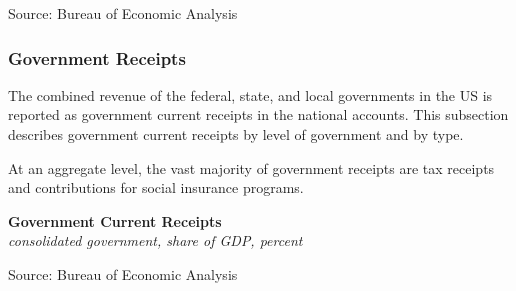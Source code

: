 \documentclass{report}
\makeatletter
\newcommand{\tbllink}[1]{\href{https://raw.githubusercontent.com/bdecon/US-chartbook/master/chartbook/data/#1}{\faTable}}
\newcommand*\short[1]{\expandafter\@gobbletwo\number\numexpr#1\relax}
\newcommand{\dateaxisticks}{
		date coordinates in=x, axis line style={draw=none},
		xmax={2023-11-30},
		max space between ticks=40,	    
		xtick={{1990-01-01}, {1992-01-01}, {1994-01-01}, 
			{1996-01-01}, {1998-01-01}, {2000-01-01}, 
			{2002-01-01}, {2004-01-01}, {2006-01-01},
			{2008-01-01}, {2010-01-01}, {2012-01-01}, {2014-01-01},
		    {2016-01-01}, {2018-01-01}, {2020-01-01}, {2022-01-01}, 
		    {2024-01-01}, {2026-01-01}},
		minor xtick={{1989-01-01}, {1991-01-01}, {1993-01-01},
			{1995-01-01}, {1997-01-01}, {1999-01-01}, 
			{2001-01-01}, {2003-01-01}, {2005-01-01}, {2007-01-01},
		    {2009-01-01}, {2011-01-01}, {2013-01-01}, {2015-01-01},
		    {2017-01-01}, {2019-01-01}, {2021-01-01}, {2023-01-01}, 
		    {2025-01-01}, {2027-01-01}},
		enlarge y limits={0.06}, enlarge x limits={0.01},
		xticklabel style={align=center, yshift=-2pt}, tick label style={inner sep=0pt},
		}
\newcommand{\bbar}[2]{extra #1 ticks = {{#2}}, extra #1 tick labels = ,
		extra #1 tick style = {grid=major, grid style={thick, black!25}},}
\newcommand{\stdline}[4]{\addplot[very thick, no markers, color=#1] 
		table [x=#2, y=#3, col sep=comma] {#4};	}
\newcommand{\thickline}[4]{\addplot[ultra thick, no markers, color=#1] 
		table [x=#2, y=#3, col sep=comma] {#4};	}
\newcommand{\rbars}{
		\fill[color=black!10] (axis cs:{1990-07-01},\pgfkeysvalueof{/pgfplots/ymin})
			rectangle (axis cs:{1991-03-01}, \pgfkeysvalueof{/pgfplots/ymax});
		\fill[color=black!10] (axis cs:{2007-12-01},\pgfkeysvalueof{/pgfplots/ymin})
			rectangle (axis cs:{2009-07-01}, \pgfkeysvalueof{/pgfplots/ymax});
		\fill[color=black!10] (axis cs:{2001-03-01},\pgfkeysvalueof{/pgfplots/ymin})
			rectangle (axis cs:{2001-11-01}, \pgfkeysvalueof{/pgfplots/ymax});
		\fill[color=black!10] (axis cs:{2020-02-01},\pgfkeysvalueof{/pgfplots/ymin})
			rectangle (axis cs:{2020-05-01}, \pgfkeysvalueof{/pgfplots/ymax});}
\makeatother
\begin{document}
{\begin{minipage}{0.76\textwidth}
\footnotesize{Source: Bureau of Economic Analysis}
\end{minipage} 
\newpage
\vspace*{-10mm}

\begin{minipage}{0.76\textwidth}
\subsubsection*{Government Receipts} 
\small The combined revenue of the federal, state, and local governments in the US is reported as government current receipts in the national accounts. This subsection describes government current receipts by level of government and by type. 

At an aggregate level, the vast majority of government receipts are tax receipts and contributions for social insurance programs. 
\vspace{0.5mm}

\normalsize \textbf{Government Current Receipts}\\
\footnotesize{\textit{consolidated government, share of GDP, percent}}
\vspace{2.95cm}

\hspace{3mm} 

\footnotesize{Source: Bureau of Economic Analysis} \hfill \tbllink{gov_rec_overview.csv}
\vspace{4.5mm}


\end{minipage}}
\end{document}
